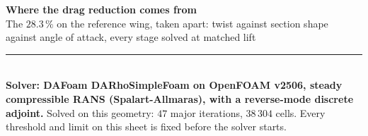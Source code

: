 \documentclass[9pt,a4paper]{article}
\renewcommand{\footnotesize}{\fontsize{6.4}{6.85}\selectfont}
\begin{document}
\fontsize{7.3}{8.5}\selectfont

{\fontsize{13.5}{15}\selectfont\bfseries Where the drag reduction comes from}\\[1.5pt]
{\fontsize{8.6}{10}\selectfont The $28.3\,\%$ on the reference wing, taken apart:
twist against section shape against angle of attack, every stage solved
at matched lift}\\[2pt]
{\color{rulegrey}\rule{\textwidth}{0.9pt}}\\[1pt]
{\footnotesize \textbf{Solver: DAFoam DARhoSimpleFoam on OpenFOAM v2506, steady
compressible RANS (Spalart-Allmaras), with a reverse-mode discrete adjoint.}
Solved on this geometry: $47$ major iterations, $38\,304$ cells.
Every threshold and limit on this sheet is fixed before the solver starts.}
\end{document}
